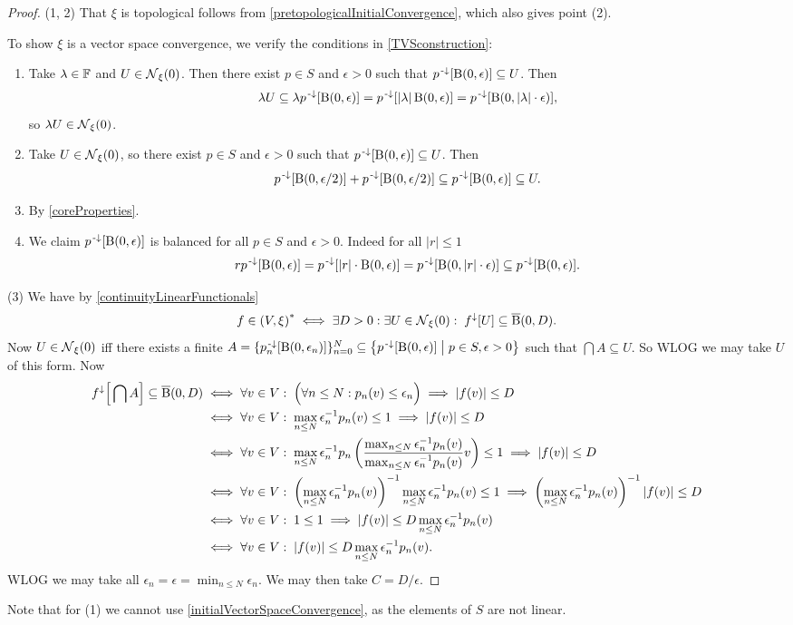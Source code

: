 \begin{proof}
(1, 2) That $\xi$ is topological follows from \ref{pretopologicalInitialConvergence}, which also gives point (2).

To show $\xi$ is a vector space convergence, we verify the conditions in \ref{TVSconstruction}:
\begin{enumerate}
\item Take $\lambda\in \mathbb{F}$ and $U\in \operatorname{\mathcal{N}}_\xi(0)$. Then there exist $p\in S$ and $\epsilon > 0$ such that $p^{\text{\hspace{0.15em}-}\downarrow}[\operatorname{B}(0,\epsilon)] \subseteq U$. Then
\[ \lambda U \subseteq \lambda p^{\text{\hspace{0.15em}-}\downarrow}[\operatorname{B}(0,\epsilon)] = p^{\text{\hspace{0.15em}-}\downarrow}[|\lambda|\operatorname{B}(0,\epsilon)] = p^{\text{\hspace{0.15em}-}\downarrow}[\operatorname{B}(0,|\lambda|\cdot \epsilon)], \]
so $\lambda U\in \operatorname{\mathcal{N}}_\xi(0)$.
\item Take $U\in \operatorname{\mathcal{N}}_\xi(0)$, so there exist $p\in S$ and $\epsilon > 0$ such that $p^{\text{\hspace{0.15em}-}\downarrow}[\operatorname{B}(0,\epsilon)] \subseteq U$. Then
\[ p^{\text{\hspace{0.15em}-}\downarrow}[\operatorname{B}(0,\epsilon/2)] + p^{\text{\hspace{0.15em}-}\downarrow}[\operatorname{B}(0,\epsilon/2)] \subseteq p^{\text{\hspace{0.15em}-}\downarrow}[\operatorname{B}(0,\epsilon)] \subseteq U. \]
\item By \ref{coreProperties}.
\item We claim $p^{\text{\hspace{0.15em}-}\downarrow}[\operatorname{B}(0,\epsilon)]$ is balanced for all $p\in S$ and $\epsilon > 0$. Indeed for all $|r|\leq 1$
\[ rp^{\text{\hspace{0.15em}-}\downarrow}[\operatorname{B}(0,\epsilon)] = p^{\text{\hspace{0.15em}-}\downarrow}[|r|\cdot \operatorname{B}(0,\epsilon)] = p^{\text{\hspace{0.15em}-}\downarrow}[\operatorname{B}(0,|r|\cdot \epsilon)] \subseteq p^{\text{\hspace{0.15em}-}\downarrow}[\operatorname{B}(0,\epsilon)]. \]
\end{enumerate}

(3) We have by \ref{continuityLinearFunctionals}
\[ f\in \left( V, \xi \right)^* \iff \exists D>0: \exists U\in \operatorname{\mathcal{N}}_\xi(0):\; f^\downarrow[U] \subseteq \operatorname{\overline{B}}(0,D). \]
Now $U\in \operatorname{\mathcal{N}}_\xi(0)$ iff there exists a finite $A = \{p_n^{\text{\hspace{0.15em}-}\downarrow}[\operatorname{B}(0,\epsilon_n)]\}_{n=0}^N \subseteq \left\{ p^{\text{\hspace{0.15em}-}\downarrow}[\operatorname{B}(0,\epsilon)] \;\middle|\; p\in S, \epsilon > 0 \right\}$ such that $\bigcap A\subseteq U$. So WLOG we may take $U$ of this form.
Now 
\begin{align*}
f^\downarrow\Big[\bigcap A\Big] \subseteq \operatorname{\overline{B}}(0,D) &\iff \forall v\in V: \; \Big(\forall n\leq N: p_n(v)\leq \epsilon_n \Big) \implies |f(v)|\leq D \\
&\iff \forall v\in V: \; \max_{n\leq N}\epsilon_n^{-1}p_n(v)\leq 1 \implies |f(v)|\leq D \\
&\iff \forall v\in V: \; \max_{n\leq N}\epsilon_n^{-1}p_n\left(\frac{\max_{n\leq N}\epsilon_n^{-1}p_n(v)}{\max_{n\leq N}\epsilon_n^{-1}p_n(v)} v\right)\leq 1 \implies |f(v)|\leq D \\
&\iff \forall v\in V: \; \left(\max_{n\leq N}\epsilon_n^{-1}p_n(v)\right)^{-1}\max_{n\leq N}\epsilon_n^{-1}p_n(v)\leq 1 \implies \left(\max_{n\leq N}\epsilon_n^{-1}p_n(v)\right)^{-1}|f(v)|\leq D \\
&\iff \forall v\in V: \; 1\leq 1 \implies |f(v)|\leq D\max_{n\leq N}\epsilon_n^{-1}p_n(v) \\
&\iff \forall v\in V: \; |f(v)|\leq D\max_{n\leq N}\epsilon_n^{-1}p_n(v).
\end{align*}
WLOG we may take all $\epsilon_n = \epsilon = \min_{n\leq N}\epsilon_n$. We may then take $C = D/\epsilon$.
\end{proof}
Note that for (1) we cannot use \ref{initialVectorSpaceConvergence}, as the elements of $S$ are not linear.

